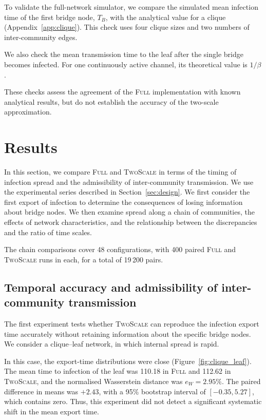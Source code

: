 \documentclass[a4paper,fleqn]{cas-sc}
\newcommand{\Full}{\textup{\textsc{Full}}}
\newcommand{\TS}{\textup{\textsc{TwoScale}}}
\newcommand{\eW}{e_{W}}
\begin{document}
To validate the full-network simulator, we compare the simulated mean infection time of the first bridge node, $T_B$, with the analytical value for a clique (Appendix~\ref*{app:clique}). This check uses four clique sizes and two numbers of inter-community edges.

We also check the mean transmission time to the leaf after the single bridge becomes infected. For one continuously active channel, its theoretical value is $1/\beta$.

These checks assess the agreement of the \Full{} implementation with known analytical results, but do not establish the accuracy of the two-scale approximation.


\section{Results}
\label{sec:results}

In this section, we compare \Full{} and \TS{} in terms of the timing of infection spread and the admissibility of inter-community transmission. We use the experimental series described in Section~\ref{sec:design}. We first consider the first export of infection to determine the consequences of losing information about bridge nodes. We then examine spread along a chain of communities, the effects of network characteristics, and the relationship between the discrepancies and the ratio of time scales.

The chain comparisons cover 48 configurations, with 400 paired \Full{} and \TS{} runs in each, for a total of 19\,200 pairs.


\subsection{Temporal accuracy and admissibility of inter-community transmission}
\label{sec:res_clique}

The first experiment tests whether \TS{} can reproduce the infection export time accurately without retaining information about the specific bridge nodes. We consider a clique--leaf network, in which internal spread is rapid.

In this case, the export-time distributions were close (Figure~\ref{fig:clique_leaf}). The mean time to infection of the leaf was 110.18 in \Full{} and 112.62 in \TS{}, and the normalised Wasserstein distance was $\eW=2.95\%$. The paired difference in means was $+2.43$, with a 95\% bootstrap interval of $[-0.35,5.27]$, which contains zero. Thus, this experiment did not detect a significant systematic shift in the mean export time.
\end{document}
